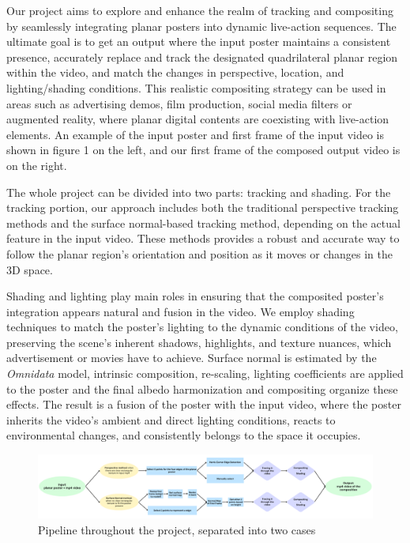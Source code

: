 \documentclass[sigconf]{acmart}
\begin{document}
Our project aims to explore and enhance the realm of tracking and compositing by seamlessly integrating planar posters into dynamic live-action sequences. The ultimate goal is to get an output where the input poster maintains a consistent presence, accurately replace and track the designated quadrilateral planar region within the video, and match the changes in perspective, location, and lighting/shading conditions. This realistic compositing strategy can be used in areas such as advertising demos, film production, social media filters or augmented reality, where planar digital contents are coexisting with live-action elements. An example of the input poster and first frame of the input video is shown in figure 1 on the left, and our first frame of the composed output video is on the right.

The whole project can be divided into two parts: tracking and shading. For the tracking portion, our approach includes both the traditional perspective tracking methods and the surface normal-based tracking method, depending on the actual feature in the input video. These methods provides a robust and accurate way to follow the planar region's orientation and position as it moves or changes in the 3D space. 

Shading and lighting play main roles in ensuring that the composited poster's integration appears natural and fusion in the video. We employ shading techniques to match the poster's lighting to the dynamic conditions of the video, preserving the scene's inherent shadows, highlights, and texture nuances, which advertisement or movies have to achieve. Surface normal is estimated by the \textit{Omnidata} model, intrinsic composition, re-scaling, lighting coefficients are applied to the poster and the final albedo harmonization and compositing organize these effects. The result is a fusion of the poster with the input video, where the poster inherits the video's ambient and direct lighting conditions, reacts to environmental changes, and consistently belongs to the space it occupies.



\begin{figure}[t]
  \centering
  \includegraphics[width=\linewidth]{fig/pipeline.png}
  \caption{Pipeline throughout the project, separated into two cases}
  \label{fig:pipeline}
   \vspace{-0.2cm}
\end{figure}
\end{document}
